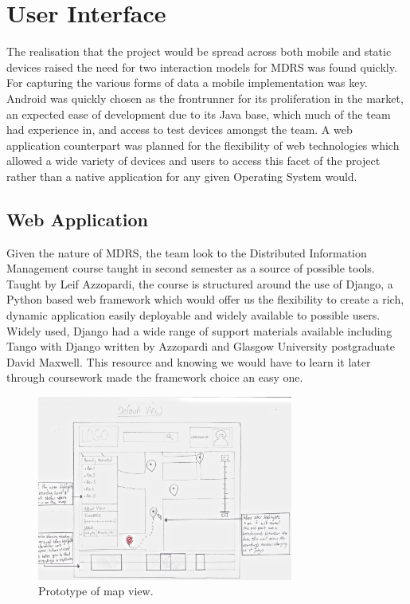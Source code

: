 \documentclass{l3proj}
\begin{document}
\section{User Interface} The realisation that the project would be spread across
both mobile and static devices raised the need for two interaction models for
MDRS was found quickly. For capturing the various forms of data a mobile
implementation was key. Android was quickly chosen as the frontrunner for its
proliferation in the market, an expected ease of development due to its Java
base, which much of the team had experience in, and access to test devices
amongst the team. A web application counterpart was planned for the flexibility
of web technologies which allowed a wide variety of devices and users to access
this facet of the project rather than a native application for any given
Operating System would.

\subsection{Web Application}   Given the nature of MDRS, the team look to the
Distributed Information Management course taught in second semester as a source
of possible tools. Taught by Leif Azzopardi, the course is structured around the
use of Django, a Python based web framework which would offer us the flexibility
to create a rich, dynamic application easily deployable and widely available to
possible users. Widely used, Django had a wide range of support materials
available including Tango with Django written by Azzopardi and Glasgow
University postgraduate David Maxwell. This resource and knowing we would have
to learn it later through coursework made the framework choice an easy one.

\begin{figure}[ht!]
  \centering
\includegraphics[width=0.75\textwidth]{images/web-map-view.jpg}
\caption{Prototype of map view.}
\end{figure}
\end{document}
